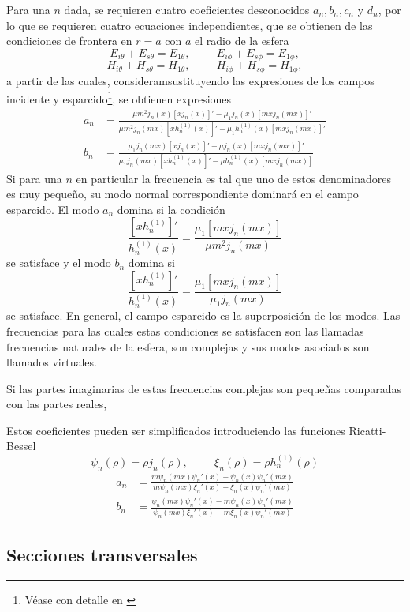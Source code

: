 Para una $n$ dada, se requieren cuatro coeficientes desconocidos $a_n,b_n,c_n$ y $d_n$, por lo que se requieren cuatro ecuaciones independientes, que se obtienen de las condiciones de frontera en $r=a$ con $a$ el radio de la esfera
$$E_{i\theta}+E_{s\theta}=E_{1\theta},\hspace{1cm}E_{i\phi}+E_{s\phi}=E_{1\phi},$$
$$H_{i\theta}+H_{s\theta}=H_{1\theta},\hspace{1cm}H_{i\phi}+H_{s\phi}=H_{1\phi},$$
a partir de las cuales, consideramsustituyendo las expresiones de los campos incidente y esparcido\footnote{Véase con detalle en \cite{Bohren}}, se obtienen expresiones 
\begin{align*}
	a_n&=\frac{\mu m^2 j_n(x)[xj_n(x)]'-\mu_1j_n(x)[mxj_n(mx)]'}{\mu m^2j_n(mx)[xh_n^{(1)}(x)]'-\mu_1 h_n^{(1)}(x)[mxj_n(mx)]'}\\
	b_n&=\frac{\mu_1 j_n(mx)[xj_n(x)]'-\mu j_n(x)[mxj_n(mx)]'}{\mu_1 j_n(mx)[xh_n^{(1)}(x)]'-\mu h_n^{(1)}(x)[mxj_n(mx)]}
\end{align*}
Si para una $n$ en particular la frecuencia es tal que uno de estos denominadores es muy pequeño, su modo normal correspondiente dominará en el campo esparcido. El modo $a_n$ domina si la condición 
\begin{equation}
	\frac{[xh_n^{(1)}]'}{h_n^{(1)}(x)}=\frac{\mu_1[mxj_n(mx)]}{\mu m^2 j_n(mx)}
\end{equation}
se satisface y el modo $b_n$ domina si 
\begin{equation}
	\frac{[xh_n^{(1)}]'}{h_n^{(1)}(x)}=\frac{\mu_1[mxj_n(mx)]}{\mu_1  j_n(mx)}
\end{equation}
se satisface. En general, el campo esparcido es la superposición de los modos. Las frecuencias para las cuales estas condiciones se satisfacen son las llamadas frecuencias naturales de la esfera, son complejas y sus modos asociados son llamados virtuales.

Si las partes imaginarias de estas frecuencias complejas son pequeñas comparadas con las partes reales,

Estos coeficientes pueden ser simplificados introduciendo las funciones Ricatti-Bessel
\begin{equation*}
	\psi_n(\rho)=\rho j_n(\rho),\hspace{1cm} \xi_n(\rho)=\rho h_n^{(1)}(\rho)
\end{equation*}
\begin{align*}
	a_n&=\frac{m\psi_n(mx)\psi_n'(x)-\psi_n(x)\psi_n'(mx)}{m\psi_n(mx)\xi_n'(x)-\xi_n(x)\psi_n'(mx)}\\
	b_n&=\frac{\psi_n(mx)\psi_n'(x)-m\psi_n(x)\psi_n'(mx)}{\psi_n(mx)\xi_n'(x)-m\xi_n(x)\psi_n'(mx)}
\end{align*}

\subsection{Secciones transversales}


